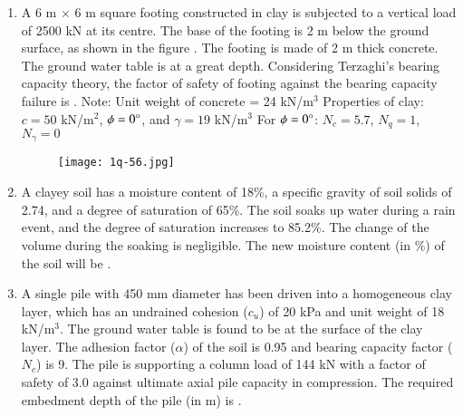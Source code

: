 \documentclass[journal,12pt,onecolumn]{article}
\theoremstyle{remark}
\begin{document}
\begin{enumerate}
\hfill{}

\item A 6 m $\times$ 6 m square footing constructed in clay is subjected to a vertical load of 2500 kN at its centre. The base of the footing is 2 m below the ground surface, as shown in the figure . The footing is made of 2 m thick concrete. The ground water table is at a great depth. Considering Terzaghi's bearing capacity theory, the factor of safety of footing against the bearing capacity failure is \underline{\hspace{2cm}} .
Note:
Unit weight of concrete = 24 kN/m$^3$
Properties of clay: $c = 50$ kN/m$^2$, $\phi = 0\degree$, and $\gamma = 19$ kN/m$^3$
For $\phi = 0\degree$: $N_c = 5.7$, $N_q = 1$, $N_\gamma = 0$
\begin{figure}[H]
    \centering
    \texttt{[image: 1q-56.jpg]}
    \caption{}
    \label{fig:q56}
\end{figure}

\hfill{}

\item A clayey soil has a moisture content of 18\%, a specific gravity of soil solids of 2.74, and a degree of saturation of 65\%. The soil soaks up water during a rain event, and the degree of saturation increases to 85.2\%. The change of the volume during the soaking is negligible. The new moisture content (in \%) of the soil will be \underline{\hspace{2cm}} .

\hfill{}

\item A single pile with 450 mm diameter has been driven into a homogeneous clay layer, which has an undrained cohesion ($c_u$) of 20 kPa and unit weight of 18 kN/m$^3$. The ground water table is found to be at the surface of the clay layer. The adhesion factor ($\alpha$) of the soil is 0.95 and bearing capacity factor ($N_c$) is 9. The pile is supporting a column load of 144 kN with a factor of safety of 3.0 against ultimate axial pile capacity in compression.
The required embedment depth of the pile (in m) is \underline{\hspace{2cm}} .

\hfill{}


\end{enumerate}
\end{document}
